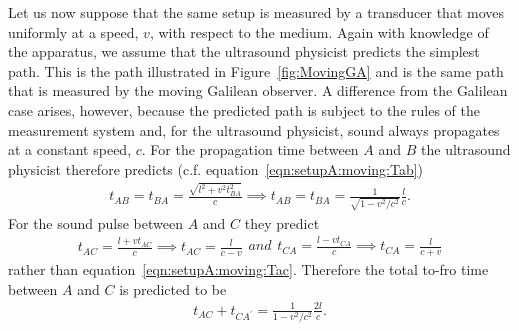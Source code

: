 \documentclass[10pt, fleqn,final,showtrims,oldfontcommands, article,a4paper,oneside]{memoir} %
\newcommand{\sub}[1]{\begin{subequations}#1\end{subequations}}
\newcommand{\figref}[1]{Figure~\ref{fig:#1}}
\begin{document}
Let us now suppose that the  same setup is measured by a transducer that moves uniformly at a speed, $v$, with respect to the medium.
Again with knowledge of the apparatus, we assume that the ultrasound physicist  predicts the simplest path.
This is the path illustrated in \figref{MovingGA} and is the same path that is measured by the  moving Galilean observer.
%
%
A difference from the Galilean case arises,
however,
because the predicted path is subject to the rules of the measurement system
and, for the ultrasound physicist,  sound always propagates at a  constant speed, $c$.
For the propagation time between $A$ and $B$ the ultrasound physicist therefore predicts (c.f. equation~\ref{eqn:setupA:moving:Tab})
\begin{align}
  \label{eqn:setupA:moving:Tab:acoustic}
  t_{AB} = t_{BA} =  \frac{\sqrt{l^2+v^2t_{BA}^2}}{c} \implies t_{AB} =  t_{BA} =\frac{1}{\sqrt{1-v^2/c^2}} \frac{l}{c}.
\end{align}
For the sound pulse between $A$ and $C$  they  predict
\sub{
\begin{align}
 t_{AC} =  \frac{l+vt_{AC}}{c}\implies t_{AC} = \frac{l}{c-v}
\end{align}
and 
\begin{align}
 t_{CA} =  \frac{l-vt_{CA}}{c} \implies t_{CA} = \frac{l}{c+v}
\end{align}
}
rather than  equation~\ref{eqn:setupA:moving:Tac}.
Therefore the total to-fro time between $A$ and $C$  is   predicted   to be
\begin{align}
\label{eqn:setupA:moving:Tac:acoustic}
t_{AC}+t_{CA^\prime} = \frac{1}{{1-v^2/c^2}} \frac{2l}{c}.
\end{align}
\end{document}
